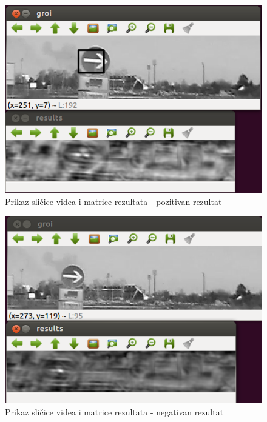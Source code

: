 \begin{figure}[h]
\centering
\includegraphics[scale=0.5]{figures/06.png}
\caption{Prikaz sličice videa i matrice rezultata - pozitivan rezultat}
\label{fig:06.png}
\end{figure}

\begin{figure}[h]
\centering
\includegraphics[scale=0.5]{figures/07.png}
\caption{Prikaz sličice videa i matrice rezultata - negativan rezultat}
\label{fig:07.png}
\end{figure}


